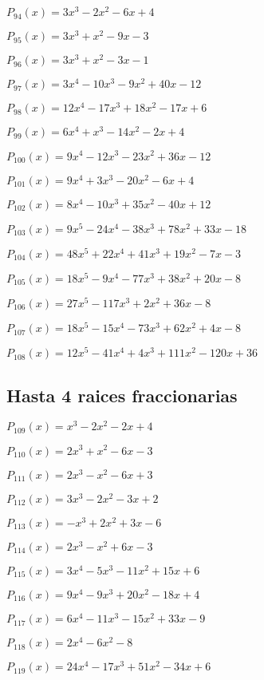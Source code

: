 \subitem $P_{94}(x) = 3x^3 - 2x^2 - 6x + 4$

\subitem $P_{95}(x) = 3x^3 + x^2 - 9x - 3$

\subitem $P_{96}(x) = 3x^3 + x^2 - 3x - 1$


\subitem $P_{97}(x) = 3x^4 - 10x^3 - 9x^2 + 40x - 12$

\subitem $P_{98}(x) = 12x^4 - 17x^3 + 18x^2 - 17x + 6$

\subitem $P_{99}(x) = 6x^4 + x^3 - 14x^2 - 2x + 4$

\subitem $P_{100}(x) = 9x^4 - 12x^3 - 23x^2 + 36x - 12$

\subitem $P_{101}(x) = 9x^4 + 3x^3 - 20x^2 - 6x + 4$

\subitem $P_{102}(x) = 8x^4 - 10x^3 + 35x^2 - 40x + 12$


\subitem $P_{103}(x) = 9x^5 - 24x^4 - 38x^3 + 78x^2 + 33x - 18$

\subitem $P_{104}(x) = 48x^5 + 22x^4 + 41x^3 + 19x^2 - 7x - 3$

\subitem $P_{105}(x) = 18x^5 - 9x^4 - 77x^3 + 38x^2 + 20x - 8$

\subitem $P_{106}(x) = 27x^5 - 117x^3 + 2x^2 + 36x - 8$

\subitem $P_{107}(x) = 18x^5 - 15x^4 - 73x^3 + 62x^2 + 4x - 8$

\subitem $P_{108}(x) = 12x^5 - 41x^4 + 4x^3 + 111x^2 - 120x + 36$

\subsection{Hasta 4 raices fraccionarias}

\subitem $P_{109}(x) = x^3 - 2x^2 - 2x + 4$

\subitem $P_{110}(x) = 2x^3 + x^2 - 6x - 3$

\subitem $P_{111}(x) = 2x^3 - x^2 - 6x + 3$

\subitem $P_{112}(x) = 3x^3 - 2x^2 - 3x + 2$

\subitem $P_{113}(x) = -x^3 + 2x^2 + 3x - 6$

\subitem $P_{114}(x) = 2x^3 - x^2 + 6x - 3$


\subitem $P_{115}(x) = 3x^4 - 5x^3 - 11x^2 + 15x + 6$

\subitem $P_{116}(x) = 9x^4 - 9x^3 + 20x^2 - 18x + 4$

\subitem $P_{117}(x) = 6x^4 - 11x^3 - 15x^2 + 33x - 9$

\subitem $P_{118}(x) = 2x^4 - 6x^2 - 8$

\subitem $P_{119}(x) = 24x^4 - 17x^3 + 51x^2 - 34x + 6$

